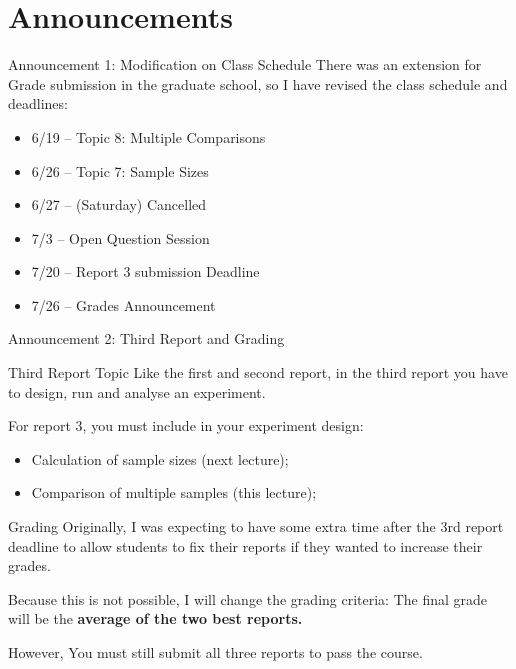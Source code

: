 \section{Announcements}

\begin{frame}{Announcement 1: Modification on Class Schedule}
  There was an extension for Grade submission in the graduate school, so
  I have revised the class schedule and deadlines:\bigskip

  \begin{itemize}
    \item 6/19 -- Topic 8: Multiple Comparisons
    \item 6/26 -- Topic 7: Sample Sizes
    \item 6/27 -- (Saturday) Cancelled
    \item 7/3  -- Open Question Session
    \item 7/20 -- Report 3 submission Deadline
    \item 7/26 -- Grades Announcement
  \end{itemize}
\end{frame}

\begin{frame}{Announcement 2: Third Report and Grading}

  {\smaller
  \begin{block}{Third Report Topic}
    Like the first and second report, in the third report you have to design, run and analyse an experiment.\bigskip

    For report 3, you must include in your experiment design:
    \begin{itemize}
      \item Calculation of sample sizes (next lecture);
      \item Comparison of multiple samples (this lecture);
    \end{itemize}
  \end{block}
  \begin{exampleblock}{Grading}
    Originally, I was expecting to have some extra time after the 3rd report
    deadline to allow students to fix their reports if they wanted to
    increase their grades.\bigskip

    Because this is not possible, I will change the grading criteria:
    The final grade will be the {\bf average of the two best reports.}\bigskip

    However, \alert{You must still submit all three reports to pass the course}.
  \end{exampleblock}}
\end{frame}

